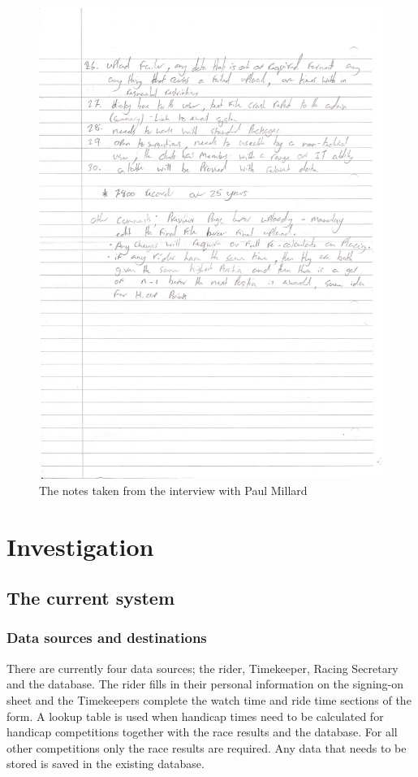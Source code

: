 \begin{figure}[H]
    \includegraphics[width=\textwidth]{./interview/InterviewNotesPage2.pdf}
    \caption{The notes taken from the interview with Paul Millard} \label{fig:Interview notes}
\end{figure}

\section{Investigation}

\subsection{The current system}

\subsubsection{Data sources and destinations}
There are currently four data sources; the rider, Timekeeper, Racing Secretary and the database. The rider fills in their personal information on the signing-on sheet and the Timekeepers complete the watch time and ride time sections of the form. A lookup table is used when handicap times need to be calculated for handicap competitions together with the race results and the database. For all other competitions only the race results are required. Any data that needs to be stored is saved in the existing database.

